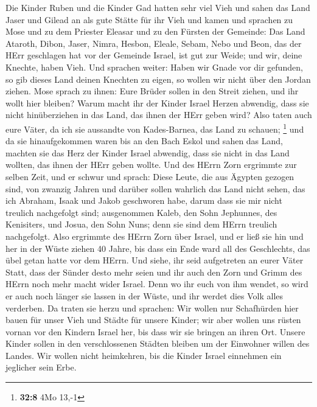  Die Kinder Ruben und die Kinder Gad hatten sehr viel Vieh
und sahen das Land Jaser und Gilead an als gute Stätte für ihr Vieh
 und kamen und sprachen zu Mose und zu dem Priester
Eleasar und zu den Fürsten der Gemeinde:  Das Land
Ataroth, Dibon, Jaser, Nimra, Hesbon, Eleale, Sebam, Nebo und Beon,
 das der HErr geschlagen hat vor der Gemeinde Israel, ist
gut zur Weide; und wir, deine Knechte, haben Vieh.  Und
sprachen weiter: Haben wir Gnade vor dir gefunden, so gib dieses Land
deinen Knechten zu eigen, so wollen wir nicht über den Jordan ziehen.
 Mose sprach zu ihnen: Eure Brüder sollen in den Streit
ziehen, und ihr wollt hier bleiben?  Warum macht ihr der
Kinder Israel Herzen abwendig, dass sie nicht hinüberziehen in das Land,
das ihnen der HErr geben wird?  Also taten auch eure
Väter, da ich sie aussandte von Kades-Barnea, das Land zu schauen;
\footnote{\textbf{32:8} 4Mo 13,-1}  und da sie
hinaufgekommen waren bis an den Bach Eskol und sahen das Land, machten
sie das Herz der Kinder Israel abwendig, dass sie nicht in das Land
wollten, das ihnen der HErr geben wollte.  Und des HErrn
Zorn ergrimmte zur selben Zeit, und er schwur und sprach:
 Diese Leute, die aus Ägypten gezogen sind, von zwanzig
Jahren und darüber sollen wahrlich das Land nicht sehen, das ich
Abraham, Isaak und Jakob geschworen habe, darum dass sie mir nicht
treulich nachgefolgt sind;  ausgenommen Kaleb, den Sohn
Jephunnes, des Kenisiters, und Josua, den Sohn Nuns; denn sie sind dem
HErrn treulich nachgefolgt.  Also ergrimmte des HErrn
Zorn über Israel, und er ließ sie hin und her in der Wüste ziehen 40
Jahre, bis dass ein Ende ward all des Geschlechts, das übel getan hatte
vor dem HErrn.  Und siehe, ihr seid aufgetreten an eurer
Väter Statt, dass der Sünder desto mehr seien und ihr auch den Zorn und
Grimm des HErrn noch mehr macht wider Israel.  Denn wo
ihr euch von ihm wendet, so wird er auch noch länger sie lassen in der
Wüste, und ihr werdet dies Volk alles verderben.  Da
traten sie herzu und sprachen: Wir wollen nur Schafhürden hier bauen für
unser Vieh und Städte für unsere Kinder;  wir aber wollen
uns rüsten vornan vor den Kindern Israel her, bis dass wir sie bringen
an ihren Ort. Unsere Kinder sollen in den verschlossenen Städten bleiben
um der Einwohner willen des Landes.  Wir wollen nicht
heimkehren, bis die Kinder Israel einnehmen ein jeglicher sein Erbe.
